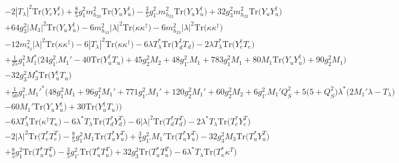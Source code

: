 {\begin{align}
 &-2 |T_{\lambda}|^2 \mbox{Tr}\Big({Y_e  Y_{e}^{\dagger}}\Big) +\frac{8}{5} g_{1}^{2} m_{h_{23}}^2 \mbox{Tr}\Big({Y_u  Y_{u}^{\dagger}}\Big) -\frac{3}{5} g_{1'}^{2} m_{h_{23}}^2 \mbox{Tr}\Big({Y_u  Y_{u}^{\dagger}}\Big) +32 g_{3}^{2} m_{h_{23}}^2 \mbox{Tr}\Big({Y_u  Y_{u}^{\dagger}}\Big) \nonumber \\ 
 &+64 g_{3}^{2} |M_3|^2 \mbox{Tr}\Big({Y_u  Y_{u}^{\dagger}}\Big) -6 m_{h_{13}}^2 |\lambda|^2 \mbox{Tr}\Big({\kappa  \kappa^{\dagger}}\Big) -6 m_{h_{23}}^2 |\lambda|^2 \mbox{Tr}\Big({\kappa  \kappa^{\dagger}}\Big) \nonumber \\ 
 &-12 m_{s_3}^2 |\lambda|^2 \mbox{Tr}\Big({\kappa  \kappa^{\dagger}}\Big) -6 |T_{\lambda}|^2 \mbox{Tr}\Big({\kappa  \kappa^{\dagger}}\Big) -6 \lambda T_{\lambda}^* \mbox{Tr}\Big({Y_{d}^{\dagger}  T_d}\Big) -2 \lambda T_{\lambda}^* \mbox{Tr}\Big({Y_{e}^{\dagger}  T_e}\Big) \nonumber \\ 
 &+\frac{1}{25} g_{1}^{2} M_1^* \Big(24 g_{1'}^{2} M_1'  -40 \mbox{Tr}\Big({Y_{u}^{\dagger}  T_u}\Big)  + 45 g_{2}^{2} M_2  + 48 g_{1'}^{2} M_1  + 783 g_{1}^{2} M_1  + 80 M_1 \mbox{Tr}\Big({Y_u  Y_{u}^{\dagger}}\Big)  + 90 g_{2}^{2} M_1 \Big)\nonumber \\ 
 &-32 g_{3}^{2} M_3^* \mbox{Tr}\Big({Y_{u}^{\dagger}  T_u}\Big) \nonumber \\ 
 &+\frac{1}{50} g_{1'}^{2} M_1'^* \Big(48 g_{1}^{2} M_1 +96 g_{1}^{2} M_1' +771 g_{1'}^{2} M_1' +120 g_{2}^{2} M_1' +60 g_{2}^{2} M_2 +6 g_{1'}^{2} M_1' Q_{S}^{2} +5 \Big(5 + Q_{S}^{2}\Big)\lambda^* \Big(2 M_1' \lambda  - T_{\lambda} \Big)\nonumber \\ 
 &-60 M_1' \mbox{Tr}\Big({Y_u  Y_{u}^{\dagger}}\Big) +30 \mbox{Tr}\Big({Y_{u}^{\dagger}  T_u}\Big) \Big)\nonumber \\ 
 &-6 \lambda T_{\lambda}^* \mbox{Tr}\Big({\kappa^{\dagger}  T_{\kappa}}\Big) -6 \lambda^* T_{\lambda} \mbox{Tr}\Big({T_d^*  Y_{d}^{T}}\Big) -6 |\lambda|^2 \mbox{Tr}\Big({T_d^*  T_{d}^{T}}\Big) -2 \lambda^* T_{\lambda} \mbox{Tr}\Big({T_e^*  Y_{e}^{T}}\Big) \nonumber \\ 
 &-2 |\lambda|^2 \mbox{Tr}\Big({T_e^*  T_{e}^{T}}\Big) -\frac{8}{5} g_{1}^{2} M_1 \mbox{Tr}\Big({T_u^*  Y_{u}^{T}}\Big) +\frac{3}{5} g_{1'}^{2} M_1' \mbox{Tr}\Big({T_u^*  Y_{u}^{T}}\Big) -32 g_{3}^{2} M_3 \mbox{Tr}\Big({T_u^*  Y_{u}^{T}}\Big) \nonumber \\ 
 &+\frac{8}{5} g_{1}^{2} \mbox{Tr}\Big({T_u^*  T_{u}^{T}}\Big) -\frac{3}{5} g_{1'}^{2} \mbox{Tr}\Big({T_u^*  T_{u}^{T}}\Big) +32 g_{3}^{2} \mbox{Tr}\Big({T_u^*  T_{u}^{T}}\Big) -6 \lambda^* T_{\lambda} \mbox{Tr}\Big({T_{\kappa}^*  \kappa^{T}}\Big) \nonumber \\ 

\end{align}}
